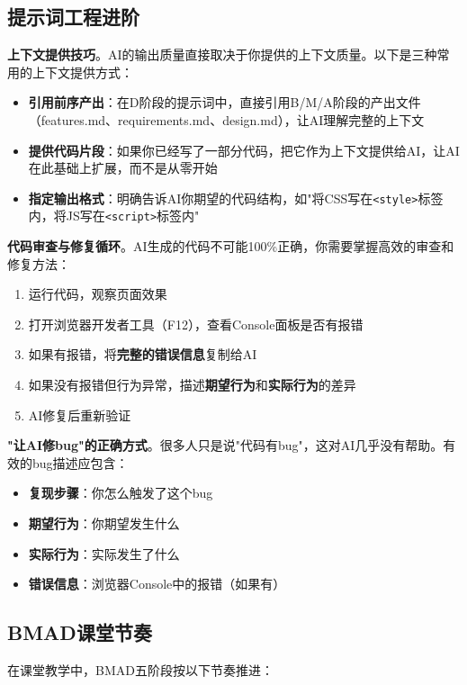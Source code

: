 \subsection{提示词工程进阶}

\textbf{上下文提供技巧}。AI的输出质量直接取决于你提供的上下文质量。以下是三种常用的上下文提供方式：
\begin{itemize}[leftmargin=2em]
  \item \textbf{引用前序产出}：在D阶段的提示词中，直接引用B/M/A阶段的产出文件（features.md、requirements.md、design.md），让AI理解完整的上下文
  \item \textbf{提供代码片段}：如果你已经写了一部分代码，把它作为上下文提供给AI，让AI在此基础上扩展，而不是从零开始
  \item \textbf{指定输出格式}：明确告诉AI你期望的代码结构，如"将CSS写在\texttt{<style>}标签内，将JS写在\texttt{<script>}标签内"
\end{itemize}

\textbf{代码审查与修复循环}。AI生成的代码不可能100\%正确，你需要掌握高效的审查和修复方法：
\begin{enumerate}[leftmargin=2em]
  \item 运行代码，观察页面效果
  \item 打开浏览器开发者工具（F12），查看Console面板是否有报错
  \item 如果有报错，将\textbf{完整的错误信息}复制给AI
  \item 如果没有报错但行为异常，描述\textbf{期望行为}和\textbf{实际行为}的差异
  \item AI修复后重新验证
\end{enumerate}

\textbf{"让AI修bug"的正确方式}。很多人只是说"代码有bug"，这对AI几乎没有帮助。有效的bug描述应包含：
\begin{itemize}[leftmargin=2em]
  \item \textbf{复现步骤}：你怎么触发了这个bug
  \item \textbf{期望行为}：你期望发生什么
  \item \textbf{实际行为}：实际发生了什么
  \item \textbf{错误信息}：浏览器Console中的报错（如果有）
\end{itemize}

\subsection{BMAD课堂节奏}

在课堂教学中，BMAD五阶段按以下节奏推进：

